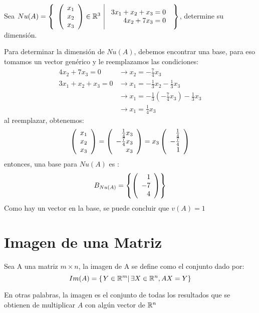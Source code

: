 \begin{ejemplo}
Sea $Nu(A)= \left\{\begin{array}{c|c} {\left( \begin{array}{c} x_1\\ x_2\\ x_3 \end{array}\right) \in \mathbb{R}^3 }&{\begin{array}{r}
    3x_1 + x_2 + x_3 = 0  \\
    4x_2 + 7x_3 = 0 
\end{array}} \end{array} \right\}$, determine su dimensión.
\end{ejemplo}
\sol 
Para determinar la dimensión de $Nu(A)$, debemos encontrar una base, para eso tomamos un vector genérico y le reemplazamos las condiciones:
\begin{align*}
    4x_2 + 7x_3 = 0 &\rightarrow x_2 = -\frac{7}{4}x_3\\
    3x_1 + x_2 + x_3 = 0 &\rightarrow x_1 = -\frac{1}{3} x_2 - \frac{1}{3}x_3\\ &\rightarrow x_1 = -\frac{1}{3}\left(-\frac{7}{4}x_3 \right) - \frac{1}{3}x_3\\
    &\rightarrow x_1 = \frac{1}{4}x_3
\end{align*}
al reemplazar, obtenemos:
\[ \left( \begin{array}{r} x_1\\ x_2\\ x_3 \end{array} \right)  = \left( \begin{array}{r} \frac{1}{4}x_3\\ -\frac{7}{4}x_3\\ x_3 \end{array} \right)   = x_3\left( \begin{array}{r} \frac{1}{4}\\ -\frac{7}{4}\\ 1 \end{array} \right) \]
entonces, una base para $Nu(A)$ es :
$$B_{Nu(A)} =  \left\{\left( \begin{array}{r} 1\\ -7\\ 4 \end{array} \right)  \right\} $$
Como hay un vector en la base, se puede concluir que $v(A) = 1$



\newpage
\section{Imagen de una Matriz}
\begin{dfn}
Sea A una matriz $m\times n$, la imagen de A se define como el conjunto dado por:
~\\
\[Im(A)=\left\{ \left. Y \in \mathbb{R}^m \right| \exists X \in \mathbb{R}^n,   AX=Y \right\}\]
\end{dfn}

En otras palabras, la imagen es el conjunto de todas los resultados que se obtienen de multiplicar $A$ con algún vector de $\mathbb{R}^n$

